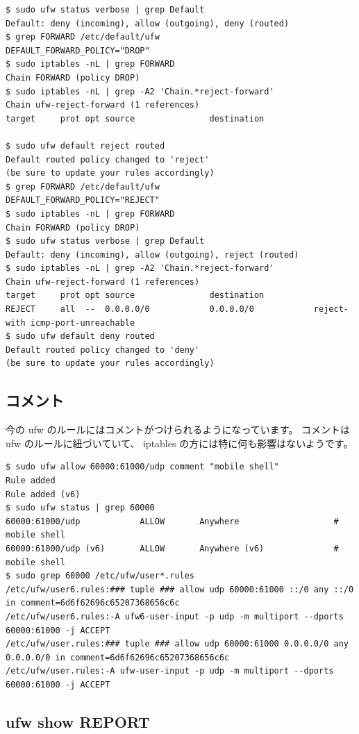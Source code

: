 \documentclass[mingoth,a4paper]{jsarticle}
\begin{document}
\begin{verbatim}
$ sudo ufw status verbose | grep Default
Default: deny (incoming), allow (outgoing), deny (routed)
$ grep FORWARD /etc/default/ufw
DEFAULT_FORWARD_POLICY="DROP"
$ sudo iptables -nL | grep FORWARD
Chain FORWARD (policy DROP)
$ sudo iptables -nL | grep -A2 'Chain.*reject-forward'
Chain ufw-reject-forward (1 references)
target     prot opt source               destination

$ sudo ufw default reject routed
Default routed policy changed to 'reject'
(be sure to update your rules accordingly)
$ grep FORWARD /etc/default/ufw
DEFAULT_FORWARD_POLICY="REJECT"
$ sudo iptables -nL | grep FORWARD
Chain FORWARD (policy DROP)
$ sudo ufw status verbose | grep Default
Default: deny (incoming), allow (outgoing), reject (routed)
$ sudo iptables -nL | grep -A2 'Chain.*reject-forward'
Chain ufw-reject-forward (1 references)
target     prot opt source               destination
REJECT     all  --  0.0.0.0/0            0.0.0.0/0            reject-with icmp-port-unreachable
$ sudo ufw default deny routed
Default routed policy changed to 'deny'
(be sure to update your rules accordingly)
\end{verbatim}

\subsection{コメント}

今の ufw のルールにはコメントがつけられるようになっています。
コメントは ufw のルールに紐づいていて、 iptables の方には特に何も影響はないようです。

\begin{verbatim}
$ sudo ufw allow 60000:61000/udp comment "mobile shell"
Rule added
Rule added (v6)
$ sudo ufw status | grep 60000
60000:61000/udp            ALLOW       Anywhere                   # mobile shell
60000:61000/udp (v6)       ALLOW       Anywhere (v6)              # mobile shell
$ sudo grep 60000 /etc/ufw/user*.rules
/etc/ufw/user6.rules:### tuple ### allow udp 60000:61000 ::/0 any ::/0 in comment=6d6f62696c65207368656c6c
/etc/ufw/user6.rules:-A ufw6-user-input -p udp -m multiport --dports 60000:61000 -j ACCEPT
/etc/ufw/user.rules:### tuple ### allow udp 60000:61000 0.0.0.0/0 any 0.0.0.0/0 in comment=6d6f62696c65207368656c6c
/etc/ufw/user.rules:-A ufw-user-input -p udp -m multiport --dports 60000:61000 -j ACCEPT
\end{verbatim}

\subsection{ufw show REPORT}
\end{document}

